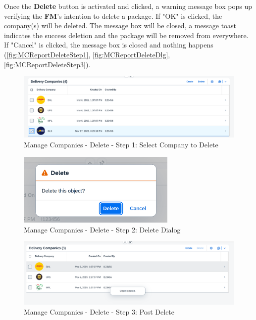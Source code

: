 Once the \textbf{Delete} button is activated and clicked, a warning message box pops up verifying the \textbf{FM}'s intention to delete a package. If "OK" is clicked, the company(s) will be deleted. The message box will be closed, a message toast indicates the success deletion and the package will be removed from everywhere. If "Cancel" is clicked, the message box is closed and nothing happens (\autoref{fig:MCReportDeleteStep1}, \autoref{fig:MCReportDeleteDlg}, 
\autoref{fig:MCReportDeleteStep3}).


\begin{figure}[H]
	\centering
	\includegraphics[width=0.90\linewidth]{images/user_doc/company/report/deleteBtnEnable.png}
	\caption{Manage Companies - Delete - Step 1: Select Company to Delete}
	\label{fig:MCReportDeleteStep1}
\end{figure}

\begin{figure}[H]
	\centering
	\includegraphics[height=100pt]{images/user_doc/company/report/deleteConfirmaton2.png}
	\caption{Manage Companies - Delete - Step 2: Delete Dialog}
	\label{fig:MCReportDeleteDlg}
\end{figure}

\begin{figure}[H]
	\centering
	\includegraphics[width=0.90\linewidth]{images/user_doc/company/report/deleteToast.png}
	\caption{Manage Companies - Delete - Step 3: Post Delete}
	\label{fig:MCReportDeleteStep3}
\end{figure}

